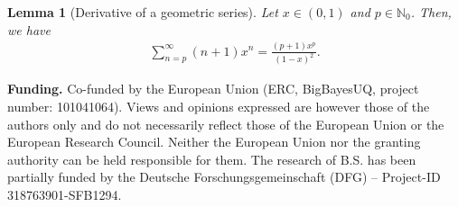 \documentclass[a4paper,11pt]{article} %
\numberwithin{equation}{section}
\theoremstyle{definition}
\theoremstyle{remark}
\theoremstyle{plain}
\newtheorem{lemma}[definition]{Lemma}
\begin{document}
\begin{lemma}[Derivative of a geometric series]%
  \label{lem_DerivativeOfAGeometricSeries}
  Let $ x \in (0, 1) $ and $ p \in \mathbb{N}_{0} $.
  Then, we have 
  \begin{align}
    \sum_{n = p}^\infty(n + 1) x^n = \frac{(p + 1) x^p}{(1 - x)^2}.
  \end{align}
\end{lemma}%



\textbf{Funding.} 
Co-funded by the European Union (ERC, BigBayesUQ, project number: 101041064).
Views and opinions expressed are however those of the authors only and do not necessarily reflect those of the European Union or the European Research Council.
Neither the European Union nor the granting authority can be held responsible for them.
The research of B.S. has been partially funded by the Deutsche Forschungsgemeinschaft
(DFG) – Project-ID 318763901-SFB1294.

\printbibliography
\end{document}
